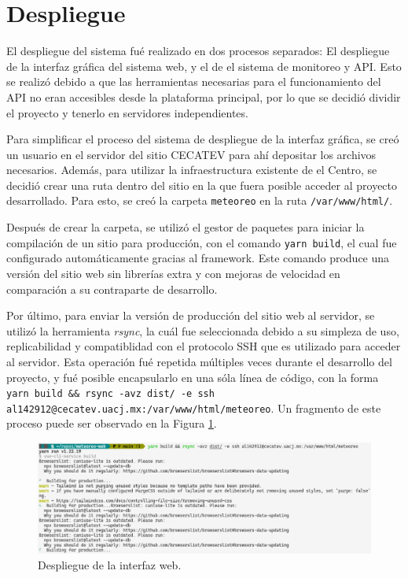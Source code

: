 \section{Despliegue}

El despliegue del sistema fué realizado en dos procesos separados: El despliegue de la interfaz gráfica del sistema web, y el de el sistema de monitoreo y API. Esto se realizó debido a que las herramientas necesarias para el funcionamiento del API no eran accesibles desde la plataforma principal, por lo que se decidió dividir el proyecto y tenerlo en servidores independientes.

Para simplificar el proceso del sistema de despliegue de la interfaz gráfica, se creó un usuario en el servidor del sitio CECATEV para ahí depositar los archivos necesarios. Además, para utilizar la infraestructura existente de el Centro, se decidió crear una ruta dentro del sitio en la que fuera posible acceder al proyecto desarrollado. Para esto, se creó la carpeta \texttt{meteoreo} en la ruta \texttt{/var/www/html/}.

Después de crear la carpeta, se utilizó el gestor de paquetes para iniciar la compilación de un sitio para producción, con el comando \texttt{yarn build}, el cual fue configurado automáticamente gracias al framework. Este comando produce una versión del sitio web sin librerías extra y con mejoras de velocidad en comparación a su contraparte de desarrollo.

Por último, para enviar la versión de producción del sitio web al servidor, se utilizó la herramienta \textit{rsync}, la cuál fue seleccionada debido a su simpleza de uso, replicabilidad y compatiblidad con el protocolo SSH que es utilizado para acceder al servidor. Esta operación fué repetida múltiples veces durante el desarrollo del proyecto, y fué posible encapsularlo en una sóla línea de código, con la forma \texttt{yarn build \&\& rsync -avz dist/ -e ssh al142912@cecatev.uacj.mx:/var/www/html/meteoreo}. Un fragmento de este proceso puede ser observado en la Figura \ref{fig:uploading-web}.

\begin{figure}[!ht]
	\centering
	\includegraphics[width=0.9\linewidth]{images/screenshots/meteoreo-web-rsync-upload.png}
	\caption{Despliegue de la interfaz web.}
	\label{fig:uploading-web}
\end{figure}

